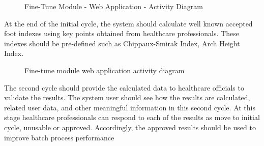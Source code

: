 \begin{figure}[htbp]
\centering
{}
\caption{Fine-Tune Module - Web Application - Activity Diagram}
\label{fig:FineTuneModuleWebApplicationActivityDiagram}
\end{figure}

At the end of the initial cycle, the system should calculate well known accepted foot indexes using key points obtained from healthcare professionals. These indexes should be pre-defined such as Chippaux-Smirak Index, Arch Height Index.

\begin{figure}[htbp]
\centering
{}
\caption{Fine-tune module web application activity diagram}
\label{fig:FineTuneModuleWebApplicationSequenceDiagram}
\end{figure}

The second cycle should provide the calculated data to healthcare officials to validate the results. The system user should see how the results are calculated, related user data, and other meaningful information in this second cycle. At this stage healthcare professionals can respond to each of the results as move to initial cycle, unusable or approved. Accordingly, the approved results should be used to improve batch process performance

